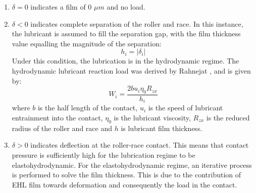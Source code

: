 \begin{enumerate}
	\item $\delta=0$ indicates a film of 0 $\mu m$ and no load.
	\item $\delta<0$ indicates complete separation of the roller and race. In this instance, the lubricant is assumed to fill the separation gap, with the film thickness value equalling the magnitude of the separation:
	\begin{equation}\label{hydrodynamic film thickness}
		h_i=\left|\delta_i\right|
	\end{equation}
	Under this condition, the lubrication is in the hydrodynamic regime. The hydrodynamic lubricant reaction load was derived by Rahnejat \cite{Rahnejat1984}, and is given by:
	\begin{equation}\label{hydrodynamic reaction load}
		W_i=\frac{2 b u_i \eta_0 R_{z x}}{h_i}
	\end{equation}
	where $b$ is the half length of the contact, $u_i$ is the speed of lubricant entrainment into the contact, $\eta_0$ is the lubricant viscosity, $R_{zx}$ is the reduced radius of the roller and race and $h$ is lubricant film thickness. 
	\item $\delta>0$ indicates deflection at the roller-race contact. This means that contact pressure is sufficiently high for the lubrication regime to be elastohydrodynamic. For the elastohydrodynamic regime, an iterative process is performed to solve the film thickness. This is due to the contribution of EHL film towards deformation and consequently the load in the contact.
	

\end{enumerate}
